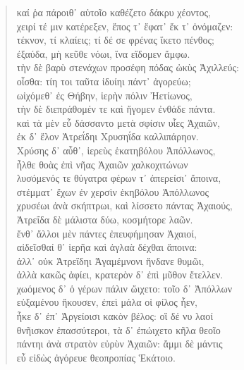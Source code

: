 \begin{Spacing}{1.5}
\begin{verse}
{\large\g καί ῥα πάροιθ᾽ αὐτοῖο καθέζετο δάκρυ χέοντος,  } \\
{\large\g χειρί τέ μιν κατέρεξεν, ἔπος τ᾽ ἔφατ᾽ ἔκ τ᾽ ὀνόμαζεν:  } \\
{\large\g τέκνον, τί κλαίεις; τί δέ σε φρένας ἵκετο πένθος;  } \\
{\large\g ἐξαύδα, μὴ κεῦθε νόωι, ἵνα εἴδομεν ἄμφω.  } \\
{\large\g τὴν δὲ βαρὺ στενάχων προσέφη πόδας ὠκὺς Ἀχιλλεύς:  } \\
{\large\g οἶσθα: τίη τοι ταῦτα ἰδυίηι πάντ᾽ ἀγορεύω;  } \\
{\large\g ωἰχόμεθ᾽ ἐς Θήβην, ἱερὴν πόλιν Ἠετίωνος,  } \\
{\large\g τὴν δὲ διεπράθομέν τε καὶ ἤγομεν ἐνθάδε πάντα.  } \\
{\large\g καὶ τὰ μὲν εὖ δάσσαντο μετὰ σφίσιν υἷες Ἀχαιῶν,  } \\
{\large\g ἐκ δ᾽ ἕλον Ἀτρεΐδηι Χρυσηΐδα καλλιπάρηον.  } \\
{\large\g Χρύσης δ᾽ αὖθ᾽, ἱερεὺς ἑκατηβόλου Ἀπόλλωνος,  } \\
{\large\g ἦλθε θοὰς ἐπὶ νῆας Ἀχαιῶν χαλκοχιτώνων  } \\
{\large\g λυσόμενός τε θύγατρα φέρων τ᾽ ἀπερείσι᾽ ἄποινα,  } \\
{\large\g στέμματ᾽ ἔχων ἐν χερσὶν ἑκηβόλου Ἀπόλλωνος  } \\
{\large\g χρυσέωι ἀνὰ σκήπτρωι, καὶ λίσσετο πάντας Ἀχαιούς,  } \\
{\large\g Ἀτρεΐδα δὲ μάλιστα δύω, κοσμήτορε λαῶν.  } \\
{\large\g  ἔνθ᾽ ἄλλοι μὲν πάντες ἐπευφήμησαν Ἀχαιοί,  } \\
{\large\g αἰδεῖσθαί θ᾽ ἱερῆα καὶ ἀγλαὰ δέχθαι ἄποινα:  } \\
{\large\g  ἀλλ᾽ οὐκ Ἀτρεΐδηι Ἀγαμέμνονι ἥνδανε θυμῶι,  } \\
{\large\g  ἀλλὰ κακῶς ἀφίει, κρατερὸν δ᾽ ἐπὶ μῦθον ἔτελλεν.  } \\
{\large\g χωόμενος δ᾽ ὁ γέρων πάλιν ὤιχετο: τοῖο δ᾽ Ἀπόλλων  } \\
{\large\g εὐξαμένου ἤκουσεν, ἐπεὶ μάλα οἱ φίλος ἦεν,  } \\
{\large\g ἧκε δ᾽ ἐπ᾽ Ἀργείοισι κακὸν βέλος: οἳ δέ νυ λαοί   } \\
{\large\g θνῆισκον ἐπασσύτεροι, τὰ δ᾽ ἐπώιχετο κῆλα θεοῖο  } \\
{\large\g πάντηι ἀνὰ στρατὸν εὐρὺν Ἀχαιῶν: ἄμμι δὲ μάντις  } \\
{\large\g εὖ εἰδὼς ἀγόρευε θεοπροπίας Ἑκάτοιο.  } \\

\end{verse}
\end{Spacing}
